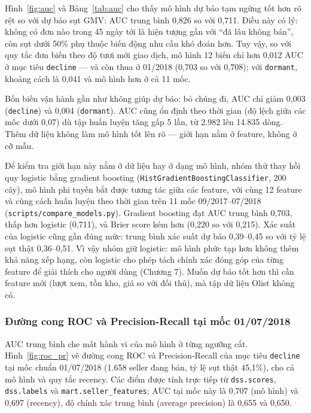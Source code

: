 Hình~\ref{fig:auc} và Bảng~\ref{tab:auc} cho thấy mô hình dự báo tạm ngừng tốt hơn rõ rệt so với dự báo sụt GMV: AUC trung bình 0,826 so với 0,711. Điều này có lý: không có đơn nào trong 45 ngày tới là hiện tượng gần với “đã lâu không bán”, còn sụt dưới 50\% phụ thuộc biến động nhu cầu khó đoán hơn. Tuy vậy, so với quy tắc đơn biến theo độ tươi mới giao dịch, mô hình 12 biến chỉ hơn 0,012 AUC ở mục tiêu \texttt{decline} — và còn thua ở 01/2018 (0,703 so với 0,708); với \texttt{dormant}, khoảng cách là 0,041 và mô hình hơn ở cả 11 mốc.

Bốn biến vận hành gần như không giúp dự báo: bỏ chúng đi, AUC chỉ giảm 0,003 (\texttt{decline}) và 0,004 (\texttt{dormant}). AUC cũng ổn định theo thời gian (độ lệch giữa các mốc dưới 0,07) dù tập huấn luyện tăng gấp 5 lần, từ 2.982 lên 14.835 dòng. Thêm dữ liệu không làm mô hình tốt lên rõ — giới hạn nằm ở feature, không ở cỡ mẫu.

Để kiểm tra giới hạn này nằm ở dữ liệu hay ở dạng mô hình, nhóm thử thay hồi quy logistic bằng gradient boosting (\texttt{HistGradientBoostingClassifier}, 200 cây), mô hình phi tuyến bắt được tương tác giữa các feature, với cùng 12 feature và cùng cách huấn luyện theo thời gian trên 11 mốc 09/2017--07/2018 (\texttt{scripts/compare\_models.py}). Gradient boosting đạt AUC trung bình 0,703, thấp hơn logistic (0,711), và Brier score kém hơn (0,220 so với 0,215). Xác suất của logistic cũng gần đúng mức: trung bình xác suất dự báo 0,39--0,45 so với tỷ lệ sụt thật 0,36--0,51. Vì vậy nhóm giữ logistic: mô hình phức tạp hơn không thêm khả năng xếp hạng, còn logistic cho phép tách chính xác đóng góp của từng feature để giải thích cho người dùng (Chương 7). Muốn dự báo tốt hơn thì cần feature mới (lượt xem, tồn kho, giá so với đối thủ), mà tập dữ liệu Olist không có.
\subsubsection*{Đường cong ROC và Precision-Recall tại mốc 01/07/2018}
AUC trung bình che mất hành vi của mô hình ở từng ngưỡng cắt. Hình~\ref{fig:roc_pr} vẽ đường cong ROC và Precision-Recall của mục tiêu \texttt{decline} tại mốc chuẩn 01/07/2018 (1.658 seller đang bán, tỷ lệ sụt thật 45,1\%), cho cả mô hình và quy tắc recency. Các điểm được tính trực tiếp từ \texttt{dss.scores}, \texttt{dss.labels} và \texttt{mart.seller\_features}; AUC tại mốc này là 0,707 (mô hình) và 0,697 (recency), độ chính xác trung bình (average precision) là 0,655 và 0,650.


